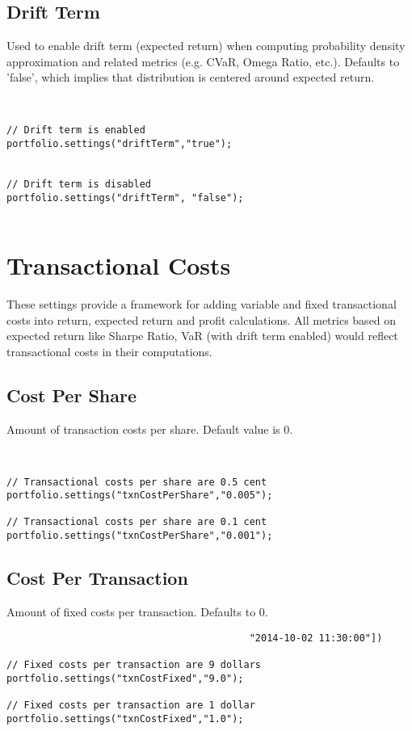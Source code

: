 \documentclass[letterpaper]{report}
\begin{document}
\subsection{Drift Term}
Used to enable drift term (expected return) when computing probability density approximation and related metrics (e.g. CVaR, Omega Ratio, etc.).
Defaults to 'false', which implies that distribution is centered around expected return.

\begin{lstlisting}


// Drift term is enabled
portfolio.settings("driftTerm","true");


// Drift term is disabled
portfolio.settings("driftTerm", "false");


\end{lstlisting}

\section{Transactional Costs}
These settings provide a framework for adding variable and fixed transactional costs into return, expected return and profit calculations.
All metrics based on expected return like Sharpe Ratio, VaR (with drift term enabled) would reflect transactional costs in their computations.
\subsection{Cost Per Share}
Amount of transaction costs per share. Default value is 0.
\begin{lstlisting}


// Transactional costs per share are 0.5 cent 
portfolio.settings("txnCostPerShare","0.005");

// Transactional costs per share are 0.1 cent 
portfolio.settings("txnCostPerShare","0.001");

\end{lstlisting}
\subsection {Cost Per Transaction}
Amount of fixed costs per transaction. Defaults to 0.
\begin{lstlisting}
                                          "2014-10-02 11:30:00"])

// Fixed costs per transaction are 9 dollars
portfolio.settings("txnCostFixed","9.0");

// Fixed costs per transaction are 1 dollar
portfolio.settings("txnCostFixed","1.0");


\end{lstlisting}
\end{document}
